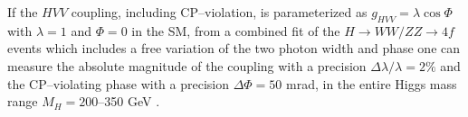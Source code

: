 \begin{figure}[!h]
\vspace*{-2mm}
\begin{center}
\end{center}
\vspace*{-5mm}
\vspace*{-5mm}
 \end{figure} 

If the $HVV$ coupling, including CP--violation, is parameterized as  $g_{HVV}= 
\lambda \cos \Phi$ with $\lambda=1$ and $\Phi=0$ in the SM, from a combined fit
of the $H \to WW/ZZ \to 4f$ events which includes a free variation of the two 
photon width and phase one can measure the absolute magnitude of the
coupling with a precision $\Delta \lambda/\lambda =2\%$ and the CP--violating
phase with a precision $\Delta \Phi= 50$ mrad, in the entire Higgs mass
range $M_H=200$--350 GeV \cite{gam-HVV-Warsaw}. \s 

